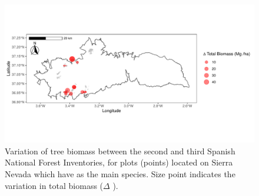 \begin{figure}
    \centering
    \includegraphics[width=\textwidth]{img/carbon/carbon-mapa-ifn.pdf}
    \caption{Variation of tree biomass between the second and third Spanish National Forest Inventories, for plots (points) located on Sierra Nevada which have \Qp as the main species. Size point indicates the variation in total biomass ($\Delta$ \mgha).}
    \label{fig:carbon:ifn}
\end{figure}

\begin{table}[]
\caption{Temporal evolution of the total biomass (ton/ha) of \Qp and the total carbon (ton/ha) between the second (SNFI2) and third (SNFI3) Spanish National Forest Inventories. Plots were aggregated by loss/gains of the tree numbers ($\Delta$ trees), and also by increase/decrease of biomass during the period analyzed. The total variation in biomass (i.e. sum for all plots), and the average variation per plot are shown for each category. }
\footnotesize
\label{tab:carbon:temporal}
\end{table} 
\normalsize

